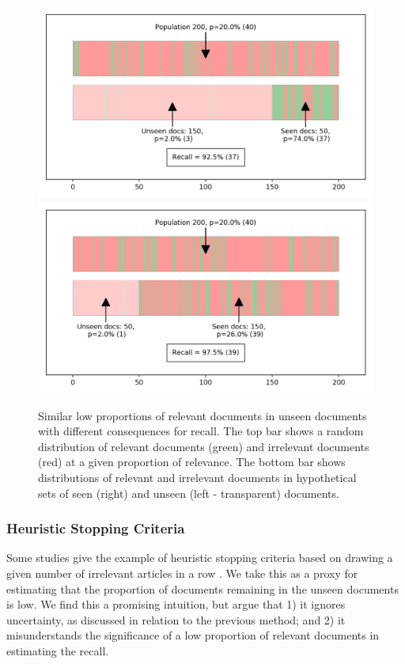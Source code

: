 \documentclass{bmcart}
\begin{document}
\begin{figure}
	\includegraphics[width=\linewidth]{../images/proportions_1.png}
	\includegraphics[width=\linewidth]{../images/proportions_2.png}
	\caption{Similar low proportions of relevant documents in unseen documents with different consequences for recall. The top bar shows a random distribution of relevant documents (green) and irrelevant documents (red) at a given proportion of relevance. The bottom bar  shows distributions of relevant and irrelevant documents in hypothetical sets of seen (right) and unseen (left - transparent) documents.}
	\label{unseen-proportions}
\end{figure}


		
\subsubsection*{Heuristic Stopping Criteria}

Some studies give the example of heuristic stopping criteria based on drawing a given number of irrelevant articles in a row \cite{Jonnalagadda2013, Przybya2018}. 
We take this as a proxy for estimating that the proportion of documents remaining in the unseen documents is low. 
We find this a promising intuition, but argue that 1) it ignores uncertainty, as discussed in relation to the previous method; and 2) it misunderstands the significance of a low proportion of relevant documents in estimating the recall.
\end{document}
